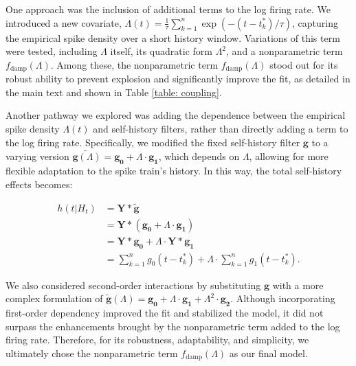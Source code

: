 \documentclass[12pt]{article}
\begin{document}
One approach was the inclusion of additional terms to the log firing rate. We introduced a new covariate, $\Lambda(t) = \frac{1}{\tau}\sum_{k=1}^n \exp(-(t-t_k^*)/\tau)$, capturing the empirical spike density over a short history window. Variations of this term were tested, including $\Lambda$ itself, its quadratic form $\Lambda^2$, and a nonparametric term $f_{\text{damp}}(\Lambda)$. Among these, the nonparametric term $f_{\text{damp}}(\Lambda)$ stood out for its robust ability to prevent explosion and significantly improve the fit, as detailed in the main text and shown in Table \ref{table: coupling}.

Another pathway we explored was adding the dependence between the empirical spike density $\Lambda(t)$ and self-history filters, rather than directly adding a term to the log firing rate. Specifically, we modified the fixed self-history filter $\mathbf{g}$ to a varying version $\tilde{\mathbf{g}(\Lambda)}=\mathbf{g_0} + \Lambda \cdot \mathbf{g_1}$, which depends on $\Lambda$, allowing for more flexible adaptation to the spike train's history. In this way, the total self-history effects becomes: 

\begin{align}
h(t | H_t)&=\mathbf{Y}*\tilde{\mathbf{g}}\\
&=\mathbf{Y}*(\mathbf{g_0} + \Lambda \cdot \mathbf{g_1}) \\
&=\mathbf{Y}*\mathbf{g_0} + \Lambda \cdot \mathbf{Y}*\mathbf{g_1} \\
&=\sum_{k=1}^n g_0(t-t_k^*) + \Lambda \cdot \sum_{k=1}^n g_1(t-t_k^*).
\end{align}

We also considered second-order interactions by substituting $\mathbf{g}$ with a more complex formulation of $\tilde{\mathbf{g}}(\Lambda) = \mathbf{g_0} + \Lambda \cdot \mathbf{g_1} + \Lambda^2 \cdot \mathbf{g_2}$. Although incorporating first-order dependency improved the fit and stabilized the model, it did not surpass the enhancements brought by the nonparametric term added to the log firing rate. Therefore, for its robustness, adaptability, and simplicity, we ultimately chose the nonparametric term $f_{\text{damp}}(\Lambda)$ as our final model.
\end{document}

